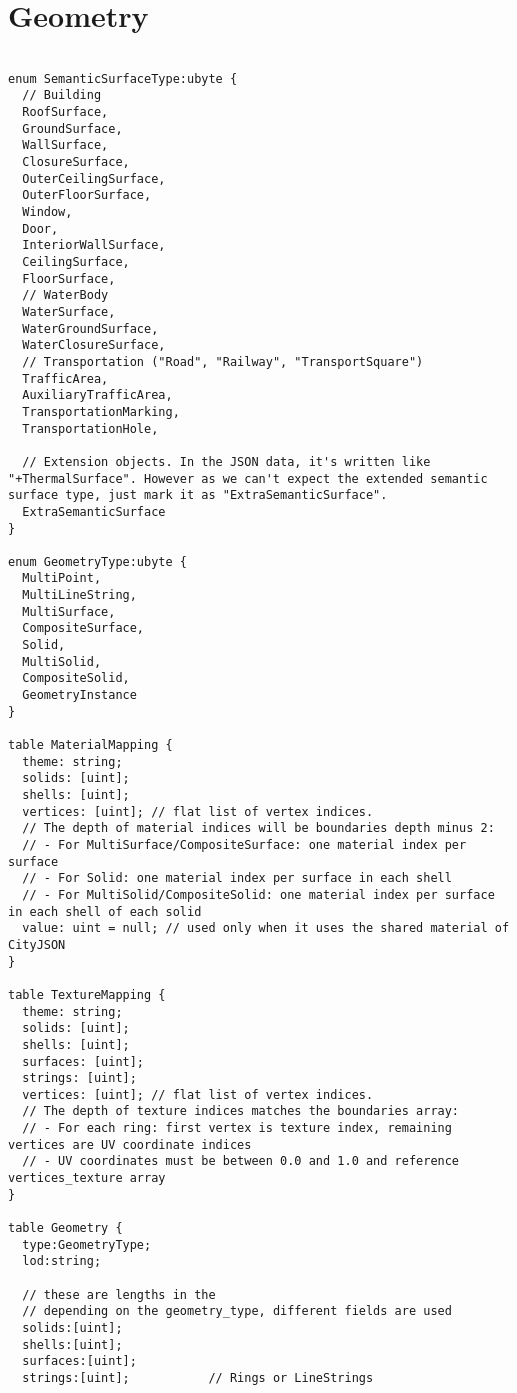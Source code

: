 \section{Geometry}
\label{appendix:flatcitybuf_schema:geometry}
\begin{lstlisting}[caption={Geometry schema}, basicstyle=\small]

enum SemanticSurfaceType:ubyte {
  // Building
  RoofSurface,
  GroundSurface,
  WallSurface,
  ClosureSurface,
  OuterCeilingSurface,
  OuterFloorSurface,
  Window,
  Door,
  InteriorWallSurface,
  CeilingSurface,
  FloorSurface,
  // WaterBody
  WaterSurface,
  WaterGroundSurface,
  WaterClosureSurface,
  // Transportation ("Road", "Railway", "TransportSquare")
  TrafficArea,
  AuxiliaryTrafficArea,
  TransportationMarking,
  TransportationHole,

  // Extension objects. In the JSON data, it's written like "+ThermalSurface". However as we can't expect the extended semantic surface type, just mark it as "ExtraSemanticSurface".
  ExtraSemanticSurface
}

enum GeometryType:ubyte {
  MultiPoint,
  MultiLineString,
  MultiSurface,
  CompositeSurface,
  Solid,
  MultiSolid,
  CompositeSolid,
  GeometryInstance
}

table MaterialMapping {
  theme: string;
  solids: [uint];
  shells: [uint];
  vertices: [uint]; // flat list of vertex indices.
  // The depth of material indices will be boundaries depth minus 2:
  // - For MultiSurface/CompositeSurface: one material index per surface
  // - For Solid: one material index per surface in each shell
  // - For MultiSolid/CompositeSolid: one material index per surface in each shell of each solid
  value: uint = null; // used only when it uses the shared material of CityJSON
}

table TextureMapping {
  theme: string;
  solids: [uint];
  shells: [uint];
  surfaces: [uint];
  strings: [uint];
  vertices: [uint]; // flat list of vertex indices.
  // The depth of texture indices matches the boundaries array:
  // - For each ring: first vertex is texture index, remaining vertices are UV coordinate indices
  // - UV coordinates must be between 0.0 and 1.0 and reference vertices_texture array
}

table Geometry {
  type:GeometryType;
  lod:string;

  // these are lengths in the
  // depending on the geometry_type, different fields are used
  solids:[uint];
  shells:[uint];
  surfaces:[uint];
  strings:[uint];           // Rings or LineStrings


\end{lstlisting}
